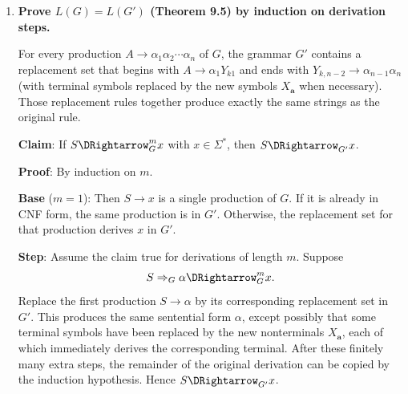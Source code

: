 \begin{enumerate}[{9.}1. ]
\begin{enumerate}
\item \textbf{Rightmost derivation} (always expand rightmost nonterminal):
\begin{align*}
R &\Rightarrow \pmb{(}R\pmb{\cup}R\pmb{)} \\
&\Rightarrow \pmb{(}R\pmb{\cup}\pmb{(}R\pmb{\cdot}R\pmb{)}^{\pmb{*}}\pmb{)} \\
&\Rightarrow \pmb{(}R\pmb{\cup(}R\pmb{\cdot}\pmb{d}\pmb{)}^{\pmb{*}}\pmb{)} \\
&\Rightarrow \pmb{(}R\pmb{\cup(}\pmb{c}\pmb{\cdot d)}^{\pmb{*}}\pmb{)} \\
&\Rightarrow \pmb{(}\pmb{(}R\pmb{\cdot}R\pmb{)}\pmb{\cup(c\cdot d)}^{\pmb{*}}\pmb{)} \\
&\Rightarrow \pmb{((}R\pmb{\cdot}\pmb{b}\pmb{)\cup(c\cdot d)}^{\pmb{*}}\pmb{)} \\
&\Rightarrow \pmb{((}R^{\pmb{*}}\pmb{\cdot b)\cup(c\cdot d)}^{\pmb{*}}\pmb{)} \\
&\Rightarrow \pmb{((a^*\cdot b)\cup(c\cdot d)}^{\pmb{*}}\pmb{)}
\end{align*}
\end{enumerate}

\item \textbf{Prove $L(G) = L(G')$ (Theorem 9.5) by induction on derivation steps.}

For every production $A\to\alpha_1\alpha_2\cdots\alpha_n$ of $G$, the grammar
$G'$ contains a replacement set that begins with
$A\to\alpha_1Y_{k1}$ and ends with
$Y_{k,n-2}\to\alpha_{n-1}\alpha_n$ (with terminal symbols replaced by the new
symbols $X_{\pmb{a}}$ when necessary).  Those replacement rules together produce
exactly the same strings as the original rule.

\textbf{Claim}: If $S\DRightarrow_G^{ m} x$ with $x\in\Sigma^*$, then
$S\DRightarrow_{G'} x$.

\textbf{Proof}: By induction on $m$.

\textbf{Base} ($m=1$): Then $S\to x$ is a single production of $G$.  If it is
already in CNF form, the same production is in $G'$.  Otherwise, the
replacement set for that production derives $x$ in $G'$.

\textbf{Step}: Assume the claim true for derivations of length $m$.  Suppose
\[
S\Rightarrow_G \alpha \DRightarrow_G^{ m} x.
\]
Replace the first production $S\to\alpha$ by its corresponding replacement set
in $G'$.  This produces the same sentential form $\alpha$, except possibly that
some terminal symbols have been replaced by the new nonterminals
$X_{\pmb{a}}$, each of which immediately derives the corresponding terminal.
After these finitely many extra steps, the remainder of the original derivation
can be copied by the induction hypothesis.  Hence $S\DRightarrow_{G'} x$.


\end{enumerate}
